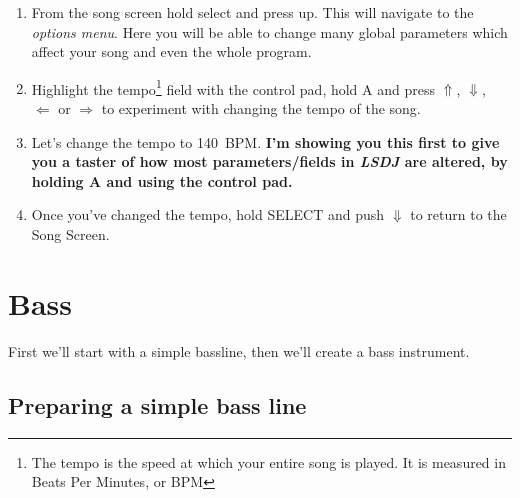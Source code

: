 \documentclass[]{article}
\newcommand{\buttonStyle}[1]{\textsf{#1}\xspace}
\newcommand{\buttonSymbolStyle}[1]{$\bm{#1}$\xspace}
\newcommand{\bA}{\buttonStyle{A}}
\newcommand{\bSelect}{\buttonStyle{{SELECT}}}
\newcommand{\bRight}{\buttonSymbolStyle{\Rightarrow}}
\newcommand{\bLeft}{\buttonSymbolStyle{\Leftarrow}}
\newcommand{\bUp}{\buttonSymbolStyle{\Uparrow}}
\newcommand{\bDown}{\buttonSymbolStyle{\Downarrow}}
\newcommand{\lsdj}{\textit{LSDJ}\xspace}
\begin{document}

\begin{enumerate}



\item From the song screen hold select and press up. This will navigate to the \textit{options menu}. Here you will be able to change many global parameters which affect your song and even the whole program.

\item Highlight the tempo\footnote{The tempo is the speed at which your entire song is played. It is measured in Beats Per Minutes, or BPM} field with the control pad, hold \bA and press \bUp, \bDown, \bLeft or \bRight to experiment with changing the tempo of the song.

\item Let's change the tempo to 140~BPM. \textbf{I'm showing you this first to give you a taster of how most parameters/fields in \lsdj are altered, by holding \bA and using the control pad.}

\item Once you've changed the tempo, hold \bSelect and push \bDown to return to the Song Screen.
\end{enumerate}

\section{Bass}

First we'll start with a simple bassline, then we'll create a bass instrument.

\subsection{Preparing a simple bass line}
\end{document}
